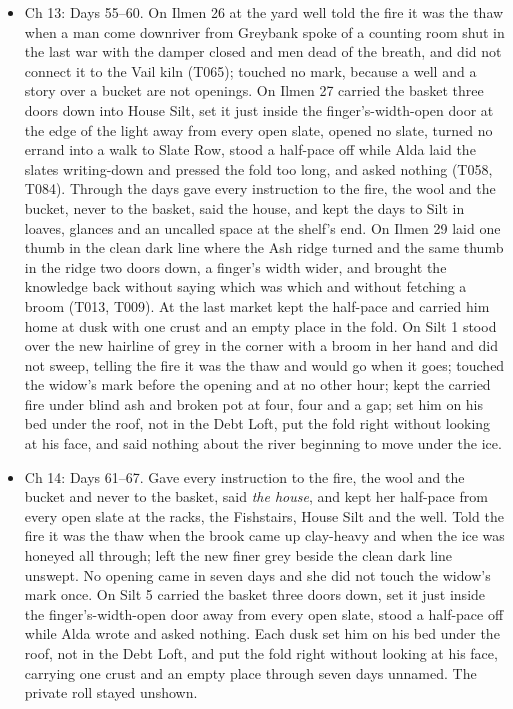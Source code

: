 \documentclass{design/chronicle}
\begin{document}
{\begin{itemize}[leftmargin=1.4em,itemsep=1pt,topsep=3pt,parsep=0pt]

\item Ch 13: Days 55--60. On Ilmen 26 at the yard well told the fire it was the thaw when a man come downriver from Greybank spoke of a counting room shut in the last war with the damper closed and men dead of the breath, and did not connect it to the Vail kiln (T065); touched no mark, because a well and a story over a bucket are not openings. On Ilmen 27 carried the basket three doors down into House Silt, set it just inside the finger’s-width-open door at the edge of the light away from every open slate, opened no slate, turned no errand into a walk to Slate Row, stood a half-pace off while Alda laid the slates writing-down and pressed the fold too long, and asked nothing (T058, T084). Through the days gave every instruction to the fire, the wool and the bucket, never to the basket, said the house, and kept the days to Silt in loaves, glances and an uncalled space at the shelf’s end. On Ilmen 29 laid one thumb in the clean dark line where the Ash ridge turned and the same thumb in the ridge two doors down, a finger’s width wider, and brought the knowledge back without saying which was which and without fetching a broom (T013, T009). At the last market kept the half-pace and carried him home at dusk with one crust and an empty place in the fold. On Silt 1 stood over the new hairline of grey in the corner with a broom in her hand and did not sweep, telling the fire it was the thaw and would go when it goes; touched the widow’s mark before the opening and at no other hour; kept the carried fire under blind ash and broken pot at four, four and a gap; set him on his bed under the roof, not in the Debt Loft, put the fold right without looking at his face, and said nothing about the river beginning to move under the ice.

\end{itemize}

\begin{itemize}[leftmargin=1.4em,itemsep=1pt,topsep=3pt,parsep=0pt]

\item Ch 14: Days 61–67. Gave every instruction to the fire, the wool and the bucket and never to the basket, said \emph{the house}, and kept her half-pace from every open slate at the racks, the Fishstairs, House Silt and the well. Told the fire it was the thaw when the brook came up clay-heavy and when the ice was honeyed all through; left the new finer grey beside the clean dark line unswept. No opening came in seven days and she did not touch the widow’s mark once. On Silt 5 carried the basket three doors down, set it just inside the finger’s-width-open door away from every open slate, stood a half-pace off while Alda wrote and asked nothing. Each dusk set him on his bed under the roof, not in the Debt Loft, and put the fold right without looking at his face, carrying one crust and an empty place through seven days unnamed. The private roll stayed unshown.


\end{itemize}}
\end{document}
